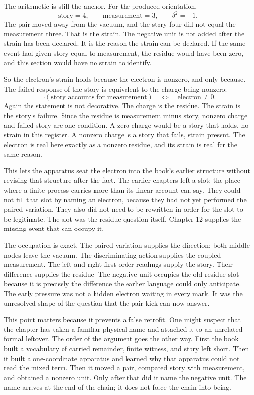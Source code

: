 The arithmetic is still the anchor. For the produced orientation,
\[
  \text{story}=4,\qquad \text{measurement}=3,\qquad
  \delta^2=-1.
\]
The pair moved away from the vacuum, and the story four did not equal the
measurement three. That is the strain. The negative unit is not added after the
strain has been declared. It is the reason the strain can be declared. If the
same event had given story equal to measurement, the residue would have been
zero, and this section would have no strain to identify.

So the electron's strain holds because the electron is nonzero, and only
because. The failed response of the story is equivalent to the charge being
nonzero:
\[
  \neg(\text{story accounts for measurement})
  \quad\Longleftrightarrow\quad
  \text{electron} \neq 0.
\]
Again the statement is not decorative. The charge is the residue. The strain is
the story's failure. Since the residue is measurement minus story, nonzero
charge and failed story are one condition. A zero charge would be a story that
holds, no strain in this register. A nonzero charge is a story that fails,
strain present. The electron is real here exactly as a nonzero residue, and its
strain is real for the same reason.

This lets the apparatus seat the electron into the book's earlier structure
without revising that structure after the fact. The earlier chapters left a
slot: the place where a finite process carries more than its linear account can
say. They could not fill that slot by naming an electron, because they had not
yet performed the paired variation. They also did not need to be rewritten in
order for the slot to be legitimate. The slot was the residue question itself.
Chapter 12 supplies the missing event that can occupy it.

The occupation is exact. The paired variation supplies the direction: both
middle nodes leave the vacuum. The discriminating action supplies the coupled
measurement. The left and right first-order readings supply the story. Their
difference supplies the residue. The negative unit occupies the old residue
slot because it is precisely the difference the earlier language could only
anticipate. The early pressure was not a hidden electron waiting in every mark.
It was the unresolved shape of the question that the pair kick can now answer.

This point matters because it prevents a false retrofit. One might suspect that
the chapter has taken a familiar physical name and attached it to an unrelated
formal leftover. The order of the argument goes the other way. First the book
built a vocabulary of carried remainder, finite witness, and story left short.
Then it built a one-coordinate apparatus and learned why that apparatus could
not read the mixed term. Then it moved a pair, compared story with measurement,
and obtained a nonzero unit. Only after that did it name the negative unit. The
name arrives at the end of the chain; it does not force the chain into being.

